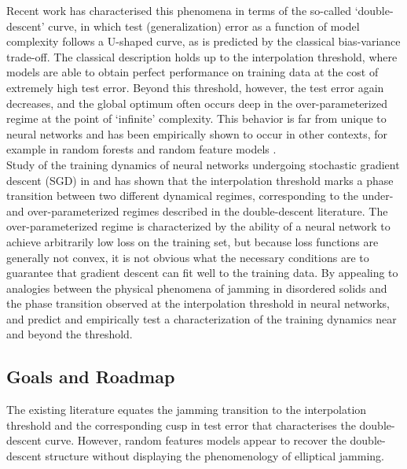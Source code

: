 \documentclass[a4paper, 12pt, titlepage]{article}
\begin{document}
Recent work \cite{belkinReconcilingModernMachine2019} has characterised this phenomena in terms of the so-called `double-descent' curve, in which test (generalization) error as a function of model complexity follows a U-shaped curve, as is predicted by the classical bias-variance trade-off. The classical description holds up to the interpolation threshold, where models are able to obtain perfect performance on training data at the cost of extremely high test error. Beyond this threshold, however, the test error again decreases, and the global optimum often occurs deep in the over-parameterized regime at the point of `infinite' complexity. This behavior is far from unique to neural networks and has been empirically shown to occur in other contexts, for example in random forests and random feature models \cite{belkinUnderstandDeepLearning2018, belkinReconcilingModernMachine2019}.\\

Study of the training dynamics of neural networks undergoing stochastic gradient descent (SGD) in \cite{baity-jesiComparingDynamicsDeep2019} and \cite{geigerJammingTransitionParadigm2019} has shown that the interpolation threshold marks a phase transition between two different dynamical regimes, corresponding to the under- and over-parameterized regimes described in the double-descent literature. The over-parameterized regime is characterized by the ability of a neural network to achieve arbitrarily low loss on the training set, but because loss functions are generally not convex, it is not obvious what the necessary conditions are to guarantee that gradient descent can fit well to the training data. By appealing to analogies between the physical phenomena of jamming in disordered solids and the phase transition observed at the interpolation threshold in neural networks, \cite{geigerJammingTransitionParadigm2019} and \cite{spiglerJammingTransitionOverparametrization2019} predict and empirically test a characterization of the training dynamics near and beyond the threshold. 

\subsection{Goals and Roadmap}
The existing literature equates the jamming transition to the interpolation threshold and the corresponding cusp in test error that characterises the double-descent curve. However, random features models appear to recover the double-descent structure without displaying the phenomenology of elliptical jamming.
\end{document}
